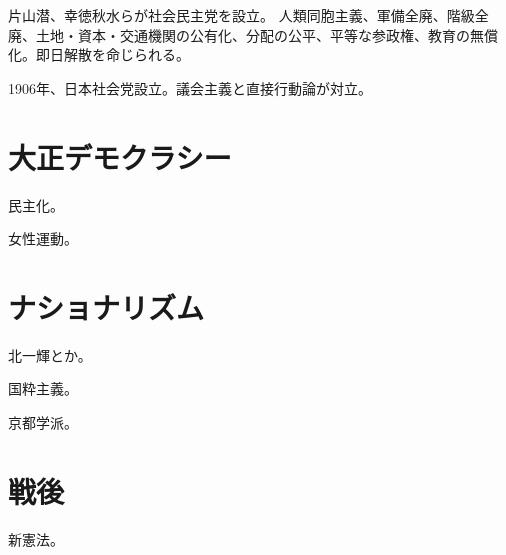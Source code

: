 \documentclass[uplatex,dvipdfmx]{jsarticle} \usepackage{mystyle}%
\begin{document}
片山潜、幸徳秋水らが社会民主党を設立。
人類同胞主義、軍備全廃、階級全廃、土地・資本・交通機関の公有化、分配の公平、平等な参政権、教育の無償化。即日解散を命じられる。

1906年、日本社会党設立。議会主義と直接行動論が対立。






\section{大正デモクラシー}

民主化。

女性運動。



\section{ナショナリズム}

北一輝とか。

国粋主義。

京都学派。

\section{戦後}

新憲法。








\ifx\mybook\undefined


\end{document}
